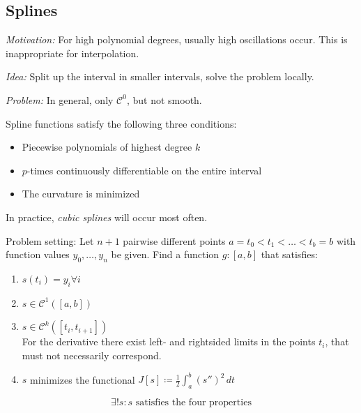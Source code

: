 \documentclass[a4paper]{article}
\numberwithin{lecref}{section}
\theoremstyle{break}
\begin{document}
\subsection{Splines}
\label{ch:4-3}

\emph{Motivation:} For high polynomial degrees, usually high oscillations occur. This is inappropriate for interpolation.

\emph{Idea:} Split up the interval in smaller intervals, solve the problem locally.

\emph{Problem:} In general, only $\mathcal C^0$, but not smooth.

Spline functions satisfy the following three conditions:
\begin{itemize}
  \item Piecewise polynomials of highest degree $k$
  \item $p$-times continuously differentiable on the entire interval
  \item The curvature is minimized
\end{itemize}
In practice, \emph{cubic splines} will occur most often.

Problem setting:
Let $n+1$ pairwise different points $a = t_0 < t_1 < \dots < t_b = b$ with function values $y_0, \dots, y_n$ be given.
Find a function $g: [a, b]$ that satisfies:
\begin{enumerate}
  \item $s(t_i) = y_i \forall i$
  \item $s \in \mathcal C^1([a, b])$
  \item $s \in \mathcal C^k([t_i, t_{i+1}])$ \\
    For the derivative there exist left- and rightsided limits in the points $t_i$, that must not necessarily correspond.
  \item $s$ minimizes the functional $J[s] \coloneqq \frac 12 \int_a^b (s'')^2 \, dt$
\end{enumerate}

\begin{theorem}
  \label{thm:4-19}
  \[ \exists! s: s \text{ satisfies the four properties} \]
\end{theorem}
\end{document}
